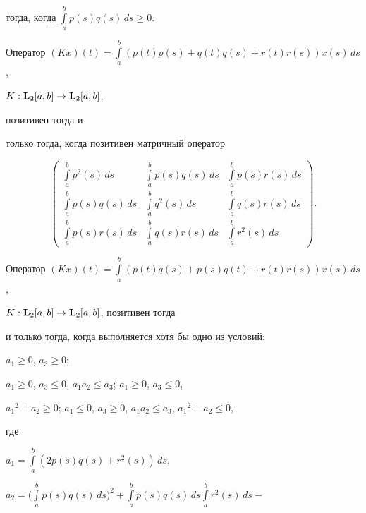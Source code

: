 тогда, когда $\int\limits_a^bp(s)q(s)\,ds\ge0$.





Оператор $(Kx)(t)=\int\limits_a^b(p(t)p(s)+q(t)q(s)+r(t)r(s))x(s)\,ds$,


$K:{\bold L}_2[a,b]\to{\bold L}_2[a,b]$,


позитивен тогда и


только тогда, когда позитивен матричный оператор


$$


\begin{pmatrix}


\int\limits_a^bp^2(s) \,ds &


\int\limits_a^bp(s)q(s)\,ds&


\int\limits_a^bp(s)r(s)\,ds\\


\int\limits_a^bp(s)q(s)\,ds &


\int\limits_a^bq^2(s) \, ds&


\int\limits_a^bq(s)r(s)\,ds\\


\int\limits_a^bp(s)r(s)\,ds&


\int\limits_a^bq(s)r(s)\,ds&\int\limits_a^br^2(s) \, ds


\end{pmatrix}.


$$





Оператор $(Kx)(t)=\int\limits_a^b(p(t)q(s)+p(s)q(t)+r(t)r(s))x(s)\,ds$,


$K:{\bold L}_2[a,b]\to{\bold L}_2[a,b]$, позитивен тогда


и только тогда, когда выполняется хотя бы одно из условий:





\noindent$a_1\ge0$, $a_3\ge0$;


$a_1\ge0$, $a_3\le0$, $a_1a_2\le a_3$; $a_1\ge0$, $a_3\le0$,


${a_1}^2+a_2\ge0$; $a_1\le0$, $a_3\ge0$, $a_1a_2\le a_3$, ${a_1}^2+a_2\le0$,


где


$a_1=\int\limits_a^b(2p(s)q(s)+r^2(s))\,ds,$


$a_2=\Big(\int\limits_a^bp(s)q(s)\,ds\Big)^2 +


\int\limits_a^bp(s)q(s)\,ds\int\limits_a^br^2(s)\,ds -$





